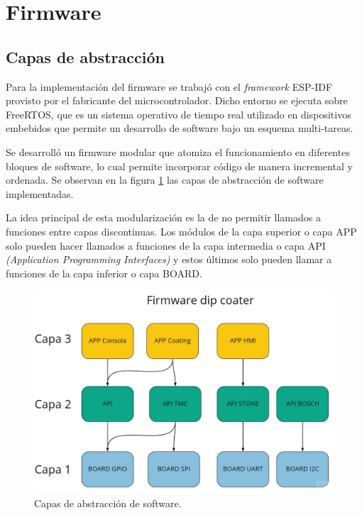 
\section{Firmware}
\subsection{Capas de abstracción}

Para la implementación del firmware se trabajó con el \textit{framework} ESP-IDF \citep{web_esp_idf} provisto por el fabricante del microcontrolador. Dicho entorno se ejecuta sobre FreeRTOS, que es un sistema operativo de tiempo real utilizado en dispositivos embebidos que permite un desarrollo de software bajo un esquema multi-tareas.

Se desarrolló un firmware modular que atomiza el funcionamiento en diferentes bloques de software, lo cual permite incorporar código de manera incremental y ordenada. Se observan en la figura \ref{fig:capas} las capas de abstracción de software implementadas.

La idea principal de esta modularización es la de no permitir llamados a funciones entre capas discontinuas. Los módulos de la capa superior o capa APP solo pueden hacer llamados a funciones de la capa intermedia o capa API \textit{(Application Programming Interfaces)} y estos últimos solo pueden llamar a funciones de la capa inferior o capa BOARD.


\begin{figure}[h]
	\centering
	\includegraphics[width=1\textwidth]{./Figures/capas.jpg}
	\caption{Capas de abstracción de software.}
	\label{fig:capas}
\end{figure}


